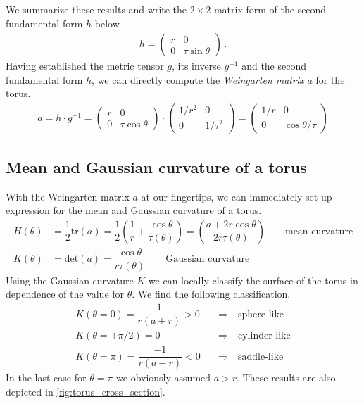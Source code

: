 \documentclass[11pt, DINA4, fleqn]{amsart}
\begin{document}
We summarize these results and write the $2\times 2$ matrix form of the second fundamental form $h$ below
\begin{align}
h = \begin{pmatrix}
r & 0 \\
0 & \tau\sin\theta
\end{pmatrix} \, .
\end{align}
Having established the metric tensor $g$, its inverse $g^{-1}$ and the second fundamental form $h$, we can directly compute the \emph{Weingarten matrix} $a$ for the torus.
\begin{align}
a = h \cdot g^{-1} =
\begin{pmatrix}
r & 0 \\0 & \tau \cos \theta
\end{pmatrix}
\cdot
\begin{pmatrix}
1/r^2 & 0 \\0 & 1/\tau^2
\end{pmatrix} = 
\begin{pmatrix}
1/r & 0 \\
0 & \cos\theta / \tau
\end{pmatrix}
\end{align}

\subsection{Mean and Gaussian curvature of a torus}
With the Weingarten matrix $a$ at our fingertips, we can immediately set up expression for the mean and Gaussian curvature of a torus.
\begin{align}
H(\theta) &= \dfrac{1}{2}\text{tr}(a) = \dfrac{1}{2}\left(\dfrac{1}{r} + \dfrac{\cos\theta}{\tau(\theta)}\right)
=\left(
\dfrac{a + 2r\cos \theta}{2r\tau(\theta)}
\right) \qquad \text{mean curvature}\\
K(\theta) &= \text{det}(a) = \dfrac{\cos\theta}{r \tau(\theta)}
\qquad \text{Gaussian curvature}
\end{align}
Using the Gaussian curvature $K$ we can locally classify the surface of the torus in dependence of the value for $\theta$. We find the following classification.
\begin{align}
K(\theta = 0) = \dfrac{1}{r(a+r)} > 0 \quad &\Longrightarrow \quad \text{sphere-like} \\
K(\theta = \pm \pi/2) = 0 \quad &\Longrightarrow \quad \text{cylinder-like} \\
K(\theta = \pi) = \dfrac{-1}{r(a-r)} < 0 \quad &\Longrightarrow \quad \text{saddle-like}
\end{align}
In the last case for $\theta = \pi$ we obviously assumed $a > r$. These results are also depicted in
\ref{fig:torus_cross_section}. 
\end{document}
